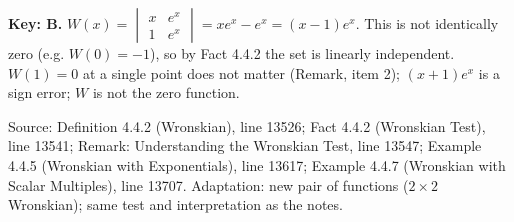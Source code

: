 \documentclass[11pt,a4paper]{article}
\newcommand{\Src}[1]{{\footnotesize\color{black!65}Source: #1}}
\begin{document}
\textbf{Key: B.} $W(x)=\begin{vmatrix}x&e^{x}\\1&e^{x}\end{vmatrix}=xe^{x}-e^{x}=(x-1)e^{x}$. This is not identically zero (e.g. $W(0)=-1$), so by Fact 4.4.2 the set is linearly independent. $W(1)=0$ at a single point does not matter (Remark, item 2); $(x+1)e^x$ is a sign error; $W$ is not the zero function.\par
\Src{Definition 4.4.2 (Wronskian), line 13526; Fact 4.4.2 (Wronskian Test), line 13541; Remark: Understanding the Wronskian Test, line 13547; Example 4.4.5 (Wronskian with Exponentials), line 13617; Example 4.4.7 (Wronskian with Scalar Multiples), line 13707. Adaptation: new pair of functions ($2\times2$ Wronskian); same test and interpretation as the notes.}\par
\end{document}
